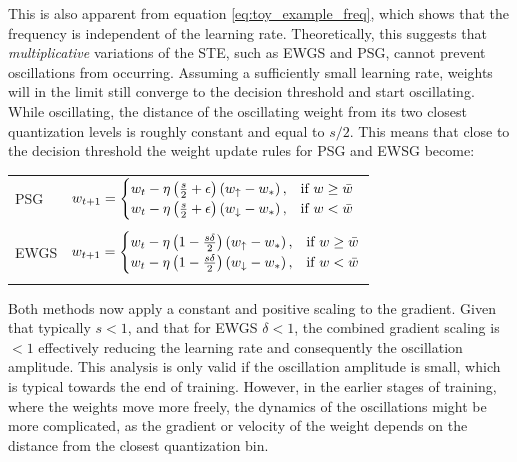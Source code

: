 This is also apparent from equation \eqref{eq:toy_example_freq}, which shows that the frequency is independent of the learning rate. Theoretically, this suggests that \textit{multiplicative} variations of the STE, such as EWGS and PSG, cannot prevent oscillations from occurring.
Assuming a sufficiently small learning rate, weights will in the limit still converge to the decision threshold and start oscillating. While oscillating, the distance of the oscillating weight from its two closest quantization levels is roughly constant and equal to $s/2$.
This means that close to the decision threshold the weight update rules for PSG and EWSG become:
\begin{center}
\begin{tabular}{ l | l } 
PSG  \citep{PBGS} & $ w_{t+1} = \begin{cases}
     w_t - \eta  \left(\frac{s}{2}+ \epsilon\right) \left(w_{\uparrow} - w_*\right)  ,   & \text{if }w \geq \bar{w}\\
    w_t - \eta \left(\frac{s}{2} + \epsilon\right)  \left(w_{\downarrow}- w_* \right) ,  & \text{if } w < \bar{w}\\
    \end{cases}$ \\
    \\[-0.5em]
  EWGS  \citep{EWGS} & $ w_{t+1} = \begin{cases}
    w_t - \eta \left(1-  \frac{s\delta}{2}\right)  \left(w_{\uparrow} - w_*\right) , & \text{if }w \geq \bar{w}\\
    w_t - \eta \left(1-  \frac{s\delta}{2} \right)  \left(w_{\downarrow}-w_* \right) , & \text{if } w < \bar{w}\\
    \end{cases}$ \\
    \\[-0.5em]
\end{tabular}
\end{center}
Both methods now apply a constant and positive scaling to the gradient. Given that typically $s<1$, and that for EWGS $\delta<1$, the combined gradient scaling is $<1$ effectively reducing the learning rate and consequently the oscillation amplitude. This analysis is only valid if the oscillation amplitude is small, which is typical towards the end of training. However, in the earlier stages of training, where the weights move more freely, the dynamics of the oscillations might be more complicated, as the gradient or velocity of the weight depends on the distance from the closest quantization bin. 

